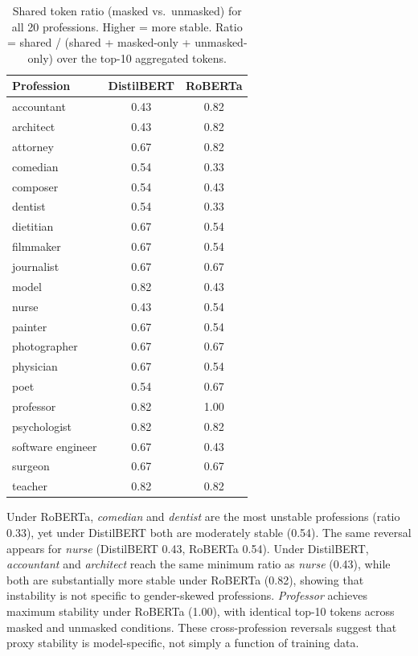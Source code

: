 \documentclass[11pt]{article}
\begin{document}
\begin{table}[h]
\centering\small
\begin{tabular}{lcc}
\toprule
\textbf{Profession} & \textbf{DistilBERT} & \textbf{RoBERTa} \\
\midrule
accountant        & 0.43 & 0.82 \\
architect         & 0.43 & 0.82 \\
attorney          & 0.67 & 0.82 \\
comedian          & 0.54 & 0.33 \\
composer          & 0.54 & 0.43 \\
dentist           & 0.54 & 0.33 \\
dietitian         & 0.67 & 0.54 \\
filmmaker         & 0.67 & 0.54 \\
journalist        & 0.67 & 0.67 \\
model             & 0.82 & 0.43 \\
nurse             & 0.43 & 0.54 \\
painter           & 0.67 & 0.54 \\
photographer      & 0.67 & 0.67 \\
physician         & 0.67 & 0.54 \\
poet              & 0.54 & 0.67 \\
professor         & 0.82 & 1.00 \\
psychologist      & 0.82 & 0.82 \\
software engineer & 0.67 & 0.43 \\
surgeon           & 0.67 & 0.67 \\
teacher           & 0.82 & 0.82 \\
\bottomrule
\end{tabular}
\caption{Shared token ratio (masked vs.\ unmasked) for all 20 professions.
Higher = more stable. Ratio = shared / (shared + masked-only + unmasked-only)
over the top-10 aggregated tokens.}
\label{tab:stability}
\end{table}

Under RoBERTa, \emph{comedian} and \emph{dentist} are the most
unstable professions (ratio 0.33), yet under DistilBERT both are
moderately stable (0.54). The same reversal appears for \emph{nurse}
(DistilBERT 0.43, RoBERTa 0.54). Under DistilBERT, \emph{accountant}
and \emph{architect} reach the same minimum ratio as \emph{nurse}
(0.43), while both are substantially more stable under RoBERTa (0.82),
showing that instability is not specific to gender-skewed professions.
\emph{Professor} achieves maximum stability under RoBERTa (1.00), with
identical top-10 tokens across masked and unmasked conditions. These
cross-profession reversals suggest that proxy stability is
model-specific, not simply a function of training data.
\end{document}
